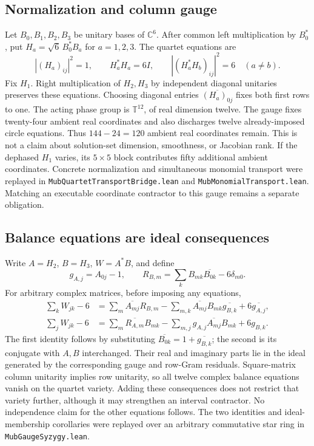\subsection{Normalization and column gauge}
Let $B_0,B_1,B_2,B_3$ be unitary bases of $\mathbb C^6$.
After common left multiplication by $B_0^*$, put
$H_a=\sqrt6\,B_0^*B_a$ for $a=1,2,3$.
The quartet equations are
\[
 |(H_a)_{ij}|^2=1,\qquad H_a^*H_a=6I,
 \qquad |(H_a^*H_b)_{ij}|^2=6\quad(a\ne b).
\]
Fix $H_1$. Right multiplication of $H_2,H_3$ by independent diagonal
unitaries preserves these equations. Choosing diagonal entries
$\overline{(H_a)_{0j}}$ fixes both first rows to one.
The acting phase group is $\mathbb T^{12}$, of real dimension twelve.
The gauge fixes twenty-four ambient real coordinates and also discharges
twelve already-imposed circle equations. Thus $144-24=120$ ambient real
coordinates remain. This is not a claim about solution-set dimension,
smoothness, or Jacobian rank. If the dephased $H_1$ varies, its $5\times5$
block contributes fifty additional ambient coordinates.
Concrete normalization and simultaneous monomial transport were replayed in
\texttt{MubQuartetTransportBridge.lean} and
\texttt{MubMonomialTransport.lean}. Matching an executable coordinate
contractor to this gauge remains a separate obligation.

\subsection{Balance equations are ideal consequences}
Write $A=H_2$, $B=H_3$, $W=A^*B$, and define
\[
 g_{A,j}=A_{0j}-1,\qquad
 R_{B,m}=\sum_kB_{mk}\overline{B_{0k}}-6\delta_{m0}.
\]
For arbitrary complex matrices, before imposing any equations,
\begin{align*}
 \sum_kW_{jk}-6
 &=\sum_m\overline{A_{mj}}R_{B,m}
   -\sum_{m,k}\overline{A_{mj}}B_{mk}\overline{g_{B,k}}
   +6\overline{g_{A,j}},\\
 \sum_jW_{jk}-6
 &=\sum_m\overline{R_{A,m}}B_{mk}
   -\sum_{m,j}g_{A,j}\overline{A_{mj}}B_{mk}+6g_{B,k}.
\end{align*}
The first identity follows by substituting
$\overline{B_{0k}}=1+\overline{g_{B,k}}$; the second is its conjugate
with $A,B$ interchanged. Their real and imaginary parts lie in the ideal
generated by the corresponding gauge and row-Gram residuals.
Square-matrix column unitarity implies row unitarity, so all twelve complex
balance equations vanish on the quartet variety. Adding these consequences
does not restrict that variety further, although it may strengthen an
interval contractor. No independence claim for the other equations follows.
The two identities and ideal-membership corollaries were replayed over an
arbitrary commutative star ring in \texttt{MubGaugeSyzygy.lean}.

